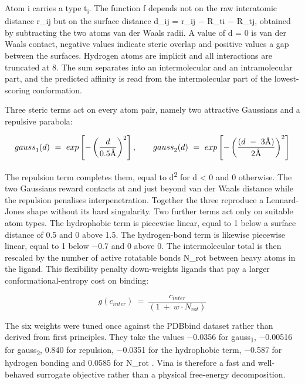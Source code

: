 Atom i carries a type t\textsubscript{i}. The function f depends not on the raw interatomic distance r\_ij but on the surface distance d\_ij = r\_ij \ensuremath{-} R\_ti \ensuremath{-} R\_tj, obtained by subtracting the two atoms\textquotesingle{} van der Waals radii. A value of d = 0 is van der Waals contact, negative values indicate steric overlap and positive values a gap between the surfaces. Hydrogen atoms are implicit and all interactions are truncated at 8\angstrom{}. The sum separates into an intermolecular and an intramolecular part, and the predicted affinity is read from the intermolecular part of the lowest-scoring conformation.

Three steric terms act on every atom pair, namely two attractive Gaussians and a repulsive parabola:

\begin{equation}
{gauss}_{1}(d)\  = \ exp\left\lbrack - \left( \frac{d}{0.5\angstrom{}} \right)^{2} \right\rbrack,\qquad
{gauss}_{2}(d)\  = \ exp\left\lbrack - \left( \frac{(d\  - \ 3\angstrom{})}{2\angstrom{}} \right)^{2} \right\rbrack
\label{eq:vina-2}
\end{equation}

The repulsion term completes them, equal to d\textsuperscript{2} for d \textless{} 0 and 0 otherwise. The two Gaussians reward contacts at and just beyond van der Waals distance while the repulsion penalises interpenetration. Together the three reproduce a Lennard-Jones shape without its hard singularity. Two further terms act only on suitable atom types. The hydrophobic term is piecewise linear, equal to 1 below a surface distance of 0.5\angstrom{} and 0 above 1.5\angstrom{}. The hydrogen-bond term is likewise piecewise linear, equal to 1 below \ensuremath{-}0.7\angstrom{} and 0 above 0. The intermolecular total is then rescaled by the number of active rotatable bonds N\_rot between heavy atoms in the ligand. This flexibility penalty down-weights ligands that pay a larger conformational-entropy cost on binding:

\begin{equation}
g\left( c_{inter} \right)\  = \ \frac{c_{inter}}{\left( 1\  + \ w \cdot N_{rot} \right)}
\label{eq:vina-5}
\end{equation}

The six weights were tuned once against the PDBbind dataset rather than derived from first principles. They take the values \ensuremath{-}0.0356 for gauss\textsubscript{1}, \ensuremath{-}0.00516 for gauss\textsubscript{2}, 0.840 for repulsion, \ensuremath{-}0.0351 for the hydrophobic term, \ensuremath{-}0.587 for hydrogen bonding and 0.0585 for N\_rot \cite{ref022}. Vina is therefore a fast and well-behaved surrogate objective rather than a physical free-energy decomposition.

